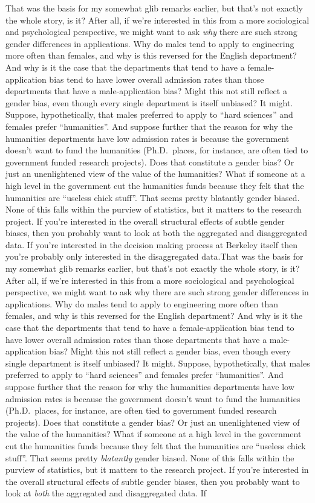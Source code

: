 \documentclass[
]{book}
\begin{document}
That was the basis for my somewhat glib remarks earlier, but that's not exactly the whole story, is it? After all, if we're interested in this from a more sociological and psychological perspective, we might want to ask \emph{why} there are such strong gender differences in applications. Why do males tend to apply to engineering more often than females, and why is this reversed for the English department? And why is it the case that the departments that tend to have a female-application bias tend to have lower overall admission rates than those departments that have a male-application bias? Might this not still reflect a gender bias, even though every single department is itself unbiased? It might. Suppose, hypothetically, that males preferred to apply to ``hard sciences'' and females prefer ``humanities''. And suppose further that the reason for why the humanities departments have low admission rates is because the government doesn't want to fund the humanities (Ph.D.~places, for instance, are often tied to government funded research projects). Does that constitute a gender bias? Or just an unenlightened view of the value of the humanities? What if someone at a high level in the government cut the humanities funds because they felt that the humanities are ``useless chick stuff''. That seems pretty blatantly gender biased. None of this falls within the purview of statistics, but it matters to the research project. If you're interested in the overall structural effects of subtle gender biases, then you probably want to look at both the aggregated and disaggregated data. If you're interested in the decision making process at Berkeley itself then you're probably only interested in the disaggregated data.That was the basis for my somewhat glib remarks earlier, but that's not exactly the whole story, is it? After all, if we're interested in this from a more sociological and psychological perspective, we might want to ask why there are such strong gender differences in applications. Why do males tend to apply to engineering more often than females, and why is this reversed for the English department? And why is it the case that the departments that tend to have a female-application bias tend to have lower overall admission rates than those departments that have a male-application bias? Might this not still reflect a gender bias, even though every single department is itself unbiased? It might. Suppose, hypothetically, that males preferred to apply to ``hard sciences'' and females prefer ``humanities''. And suppose further that the reason for why the humanities departments have low admission rates is because the government doesn't want to fund the humanities (Ph.D.~places, for instance, are often tied to government funded research projects). Does that constitute a gender bias? Or just an unenlightened view of the value of the humanities? What if someone at a high level in the government cut the humanities funds because they felt that the humanities are ``useless chick stuff''. That seems pretty \emph{blatantly} gender biased. None of this falls within the purview of statistics, but it matters to the research project. If you're interested in the overall structural effects of subtle gender biases, then you probably want to look at \emph{both} the aggregated and disaggregated data. If 
\end{document}
